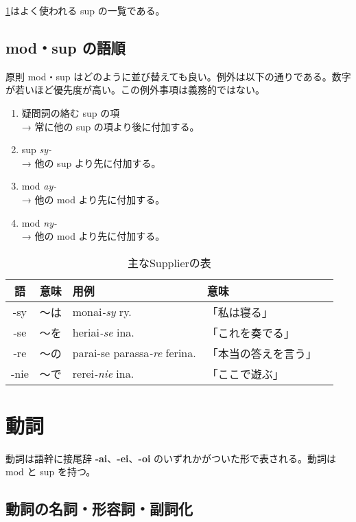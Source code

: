 \cref{table:common-sups}はよく使われる sup の一覧である。

\subsection{mod・sup の語順}

原則 mod・sup はどのように並び替えても良い。例外は以下の通りである。数字が若いほど優先度が高い。この例外事項は義務的ではない。

\begin{enumerate}
    \item 疑問詞の絡む sup の項 \\ → 常に他の sup の項より後に付加する。
    \item sup \emph{sy-} \\ → 他の sup より先に付加する。
    \item mod \emph{ay-} \\ → 他の mod より先に付加する。
    \item mod \emph{ny-} \\ → 他の mod より先に付加する。
\end{enumerate}

\begin{table}[h]
    \centering
    \caption{主なSupplierの表}
    \label{table:common-sups}
    \begin{tabular}{cclll}
        \hline
        語 & 意味 & 用例 & 意味 \\
        \hline \hline
        -sy  & ～は & monai\emph{-sy} ry.                & 「私は寝る」\\
        -se  & ～を & heriai\emph{-se} ina.              & 「これを奏でる」\\
        -re  & ～の & parai-se parassa\emph{-re} ferina. & 「本当の答えを言う」\\
        -nie & ～で & rerei\emph{-nie} ina.              & 「ここで遊ぶ」 \\
        \hline
    \end{tabular}
\end{table}

\section{動詞}

動詞は語幹に接尾辞 \textbf{-ai}、\textbf{-ei}、\textbf{-oi} のいずれかがついた形で表される。動詞は mod と sup を持つ。

\subsection{動詞の名詞・形容詞・副詞化}

